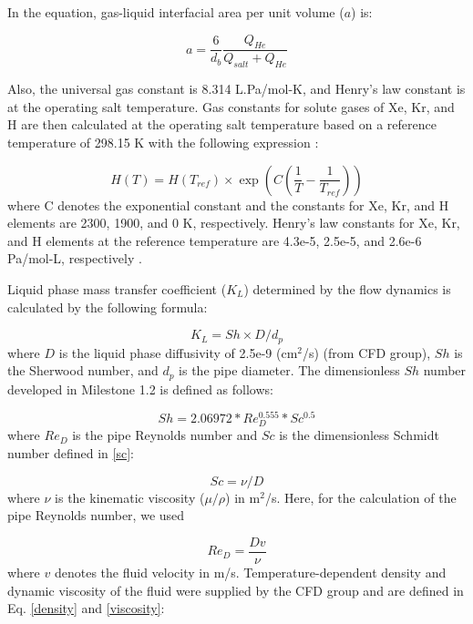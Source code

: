     In the equation, gas-liquid interfacial area per unit volume ($a$) is:

    \begin{equation}\label{interfacial}
        a = \frac{6}{d_b} \frac{Q_{He}}{Q_{salt}+Q_{He}}
    \end{equation}

    Also, the universal gas constant is 8.314 L.Pa/mol-K, and Henry's law 
    constant is at the operating salt temperature. Gas constants for solute 
    gases of Xe, Kr, and H are then calculated at the operating salt 
    temperature based on a reference temperature of 298.15 K with the following 
    expression \cite{acp-15-4399-2015}:

    \begin{equation}\label{henry}
        H(T) = H(T_{ref})\times\exp(C(\frac{1}{T}-\frac{1}{T_{ref}}))
    \end{equation}
    where C denotes the exponential constant and the constants for Xe, Kr, and 
    H elements are 2300, 1900, and 0 K, respectively. Henry's law constants for 
    Xe, Kr, and H elements at the reference temperature are  4.3e-5, 2.5e-5, 
    and 2.6e-6 Pa/mol-L, respectively \cite{acp-15-4399-2015}.

    Liquid phase mass transfer coefficient ($K_L$) determined by the flow 
    dynamics is calculated by the following formula:

    \begin{equation}\label{kl}
        K_L = Sh \times D / d_p
    \end{equation}
    where $D$ is the liquid phase diffusivity of 2.5e-9 (cm$^2$/s) (from CFD 
    group), $Sh$ is the Sherwood number, and $d_p$ is the pipe diameter. The 
    dimensionless $Sh$ number developed in Milestone 1.2 is defined as follows:

    \begin{equation}\label{sh}
        Sh = 2.06972 * Re_D^{0.555} * Sc^{0.5}
    \end{equation}
    where $Re_D$ is the pipe Reynolds number and $Sc$ is the dimensionless 
    Schmidt number defined in \ref{sc}:

    \begin{equation}\label{sc}
        Sc = \nu/D
    \end{equation}
    where $\nu$ is the kinematic viscosity ($\mu/\rho$) in m$^2$/s. Here, for 
    the calculation of the pipe Reynolds number, we used

    \begin{equation}\label{reynold}
        Re_D = \frac{Dv}{\nu}
    \end{equation}
    where $v$ denotes the fluid velocity in m/s. Temperature-dependent density 
    and dynamic viscosity of the fluid were supplied by the CFD group and are 
    defined in Eq. \ref{density} and \ref{viscosity}:

